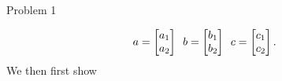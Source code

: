 \begin{problem}{Problem 1}
\begin{Highlight}
        \begin{equation}
            a = 
            \begin{bmatrix}
                a_{1} \\
                a_{2} \\
            \end{bmatrix}
            \hspace*{5pt}
            b = 
            \begin{bmatrix}
                b_{1} \\
                b_{2} \\
            \end{bmatrix}
            \hspace*{5pt}
            c = 
            \begin{bmatrix}
                c_{1} \\
                c_{2} \\
            \end{bmatrix}.
        \end{equation}
        We then first show


\end{Highlight}
\end{problem}
